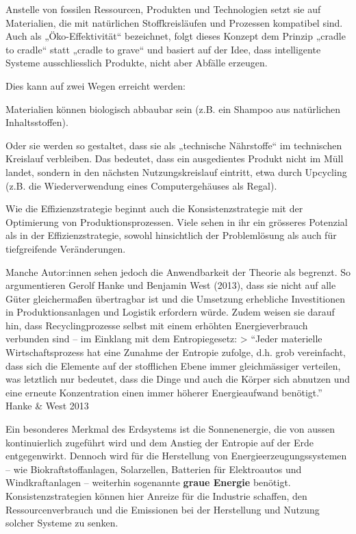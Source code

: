 \documentclass[
  letterpaper,
  DIV=11,
  numbers=noendperiod]{scrartcl}
\begin{document}
Anstelle von fossilen Ressourcen, Produkten und Technologien setzt sie
auf Materialien, die mit natürlichen Stoffkreisläufen und Prozessen
kompatibel sind. Auch als „Öko-Effektivität`` bezeichnet, folgt dieses
Konzept dem Prinzip „cradle to cradle`` statt „cradle to grave`` und
basiert auf der Idee, dass intelligente Systeme ausschliesslich
Produkte, nicht aber Abfälle erzeugen.

Dies kann auf zwei Wegen erreicht werden:

Materialien können biologisch abbaubar sein (z.B. ein Shampoo aus
natürlichen Inhaltsstoffen).

Oder sie werden so gestaltet, dass sie als „technische Nährstoffe`` im
technischen Kreislauf verbleiben. Das bedeutet, dass ein ausgedientes
Produkt nicht im Müll landet, sondern in den nächsten Nutzungskreislauf
eintritt, etwa durch Upcycling (z.B. die Wiederverwendung eines
Computergehäuses als Regal).

Wie die Effizienzstrategie beginnt auch die Konsistenzstrategie mit der
Optimierung von Produktionsprozessen. Viele sehen in ihr ein grösseres
Potenzial als in der Effizienzstrategie, sowohl hinsichtlich der
Problemlösung als auch für tiefgreifende Veränderungen.

Manche Autor:innen sehen jedoch die Anwendbarkeit der Theorie als
begrenzt. So argumentieren Gerolf Hanke und Benjamin West (2013), dass
sie nicht auf alle Güter gleichermaßen übertragbar ist und die Umsetzung
erhebliche Investitionen in Produktionsanlagen und Logistik erfordern
würde. Zudem weisen sie darauf hin, dass Recyclingprozesse selbst mit
einem erhöhten Energieverbrauch verbunden sind -- im Einklang mit dem
Entropiegesetz: \textgreater{} ``Jeder materielle Wirtschaftsprozess hat
eine Zunahme der Entropie zufolge, d.h. grob vereinfacht, dass sich die
Elemente auf der stofflichen Ebene immer gleichmässiger verteilen, was
letztlich nur bedeutet, dass die Dinge und auch die Körper sich abnutzen
und eine erneute Konzentration einen immer höherer Energieaufwand
benötigt.'' Hanke \& West 2013

Ein besonderes Merkmal des Erdsystems ist die Sonnenenergie, die von
aussen kontinuierlich zugeführt wird und dem Anstieg der Entropie auf
der Erde entgegenwirkt. Dennoch wird für die Herstellung von
Energieerzeugungssystemen -- wie Biokraftstoffanlagen, Solarzellen,
Batterien für Elektroautos und Windkraftanlagen -- weiterhin sogenannte
\textbf{graue Energie} benötigt. Konsistenzstrategien können hier
Anreize für die Industrie schaffen, den Ressourcenverbrauch und die
Emissionen bei der Herstellung und Nutzung solcher Systeme zu senken.
\end{document}
